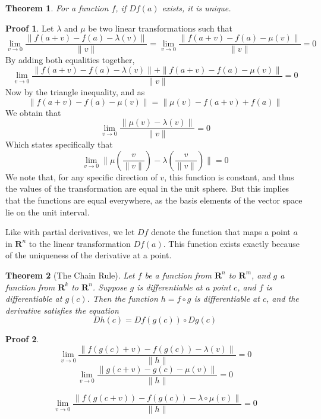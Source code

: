 \documentclass[12pt]{amsbook}
\theoremstyle{plain}
\newtheorem{theorem}{Theorem}
\theoremstyle{definition}
\newtheorem*{prf}{Proof}
\begin{document}
\begin{theorem}
  For a function $f$, if $Df(a)$ exists, it is unique.
\end{theorem}
\begin{prf}
  Let $\lambda$ and $\mu$ be two linear transformations such that
  \[ \lim_{v \to 0} \frac{\|f(a + v) - f(a) - \lambda(v)\|}{\|v\|} = \lim_{v \to 0} \frac{\|f(a + v) - f(a) - \mu(v)\|}{\|v\|} = 0 \]
  By adding both equalities together,
  \[ \lim_{v \to 0} \frac{\|f(a + v) - f(a) - \lambda(v)\| + \|f(a + v) - f(a) - \mu(v)\|}{\|v\|} = 0 \]
  Now by the triangle inequality, and as
  \[ \|f(a + v) - f(a) - \mu(v)\| = \|\mu(v) - f(a + v) + f(a)\| \]
  We obtain that
  \[ \lim_{v \to 0} \frac{\|\mu(v) - \lambda(v)\|}{\|v\|} = 0 \]
  Which states specifically that
  \[ \lim_{v \to 0} \|\mu(\frac{v}{\|v\|}) - \lambda(\frac{v}{\|v\|})\| = 0 \]
  We note that, for any specific direction of $v$, this function is constant, and thus the values of the transformation are equal in the unit sphere. But this implies that the functions are equal everywhere, as the basis elements of the vector space lie on the unit interval.
\end{prf}

Like with partial derivatives, we let $Df$ denote the function that maps a point $a$ in $\mathbf{R}^n$ to the linear transformation $Df(a)$. This function exists exactly because of the uniqueness of the derivative at a point.

\begin{theorem}[The Chain Rule]
  Let $f$ be a function from $\mathbf{R}^n$ to $\mathbf{R}^m$, and $g$ a function from $\mathbf{R}^k$ to $\mathbf{R}^n$. Suppose $g$ is differentiable at a point $c$, and $f$ is differentiable at $g(c)$. Then the function $h = f \circ g$ is differentiable at $c$, and the derivative satisfies the equation
  \[ Dh(c) = Df(g(c)) \circ Dg(c) \]
\end{theorem}
\begin{prf}
  \[ \lim_{v \to 0} \frac{\|f(g(c) + v) - f(g(c)) - \lambda(v)\|}{\|h\|} = 0 \]
  \[ \lim_{v \to 0} \frac{\|g(c + v) - g(c) - \mu(v)\|}{\|h\|} = 0 \]

  \[ \lim_{v \to 0} \frac{\| f(g(c + v)) - f(g(c)) - \lambda \circ \mu (v)\|}{\|h\|} = 0 \]
\end{prf}
\end{document}
